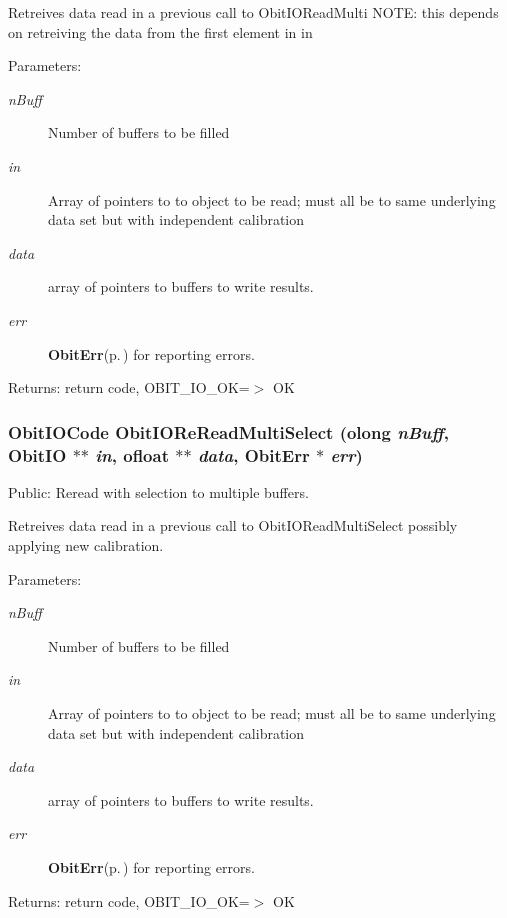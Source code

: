 Retreives data read in a previous call to Obit\-IORead\-Multi NOTE: this depends on retreiving the data from the first element in in \begin{Desc}
\item[Parameters:]
\begin{description}
\item[{\em n\-Buff}]Number of buffers to be filled \item[{\em in}]Array of pointers to to object to be read; must all be to same underlying data set but with independent calibration \item[{\em data}]array of pointers to buffers to write results. \item[{\em err}]{\bf Obit\-Err}{\rm (p.\,\pageref{structObitErr})} for reporting errors. \end{description}
\end{Desc}
\begin{Desc}
\item[Returns:]return code, OBIT\_\-IO\_\-OK=$>$ OK \end{Desc}
\subsubsection{\setlength{\rightskip}{0pt plus 5cm}Obit\-IOCode Obit\-IORe\-Read\-Multi\-Select ({\bf olong} {\em n\-Buff}, {\bf Obit\-IO} $\ast$$\ast$ {\em in}, {\bf ofloat} $\ast$$\ast$ {\em data}, {\bf Obit\-Err} $\ast$ {\em err})}\label{ObitIO_8h_a44}


Public: Reread with selection to multiple buffers. 

Retreives data read in a previous call to Obit\-IORead\-Multi\-Select possibly applying new calibration. \begin{Desc}
\item[Parameters:]
\begin{description}
\item[{\em n\-Buff}]Number of buffers to be filled \item[{\em in}]Array of pointers to to object to be read; must all be to same underlying data set but with independent calibration \item[{\em data}]array of pointers to buffers to write results. \item[{\em err}]{\bf Obit\-Err}{\rm (p.\,\pageref{structObitErr})} for reporting errors. \end{description}
\end{Desc}
\begin{Desc}
\item[Returns:]return code, OBIT\_\-IO\_\-OK=$>$ OK \end{Desc}
